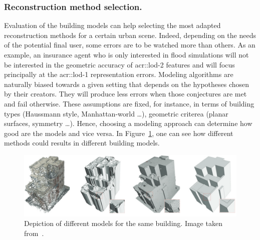         \subsubsection{Reconstruction method selection.}
            Evaluation of the building models can help selecting the most adapted reconstruction methods for a certain urban scene.
            Indeed, depending on the needs of the potential final user, some errors are to be watched more than others.
            As an example, an insurance agent who is only interested in flood simulations will not be interested in the geometric accuracy of \gls{acr::lod}-2 features and will focus principally at the \gls{acr::lod}-1 representation errors.
            Modeling algorithms are naturally biased towards a given setting that depends on the hypotheses chosen by their creators.
            They will produce less errors when those conjectures are met and fail otherwise.
            These assumptions are fixed, for instance, in terms of building types (Haussmann style, Manhattan-world \dots), geometric criterea (planar surfaces, symmetry \dots).
            Hence, choosing a modeling approach can determine how good are the models and vice versa.
            In Figure~\ref{fig::comparison}, one can see how different methods could results in different building models.
            \begin{figure}[htb]
                \centering
                \includegraphics[width=.7\textwidth]{images/introduction/use/comparison_li}
                \caption[
                    Depiction of different models for the same building.
                ]{
                    \label{fig::comparison}
                    Depiction of different models for the same building.
                    Image taken from~\parencite{li2016manhattan}.
                }
            \end{figure}

